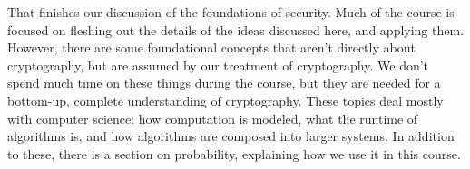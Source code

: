 That finishes our discussion of the foundations of security. Much of the course is focused on fleshing out the details of the ideas discussed here, and applying them. However, there are some foundational concepts that aren't directly about cryptography, but are assumed by our treatment of cryptography. We don't spend much time on these things during the course, but they are needed for a bottom-up, complete understanding of cryptography. These topics deal mostly with computer science: how computation is modeled, what the runtime of algorithms is, and how algorithms are composed into larger systems. In addition to these, there is a section on probability, explaining how we use it in this course.